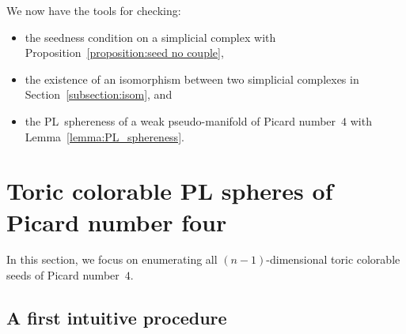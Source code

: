 \documentclass[11pt]{amsart}
\theoremstyle{plain}
\numberwithin{equation}{section}
\theoremstyle{definition}
\newtheorem{remark}[theorem]{Remark}
\newcommand{\R}{\mathbb{R}}
\begin{document}
We now have the tools for checking:
\begin{itemize}
	\item the seedness condition on a simplicial complex with Proposition~\ref{proposition:seed no couple},
	\item the existence of an isomorphism between two simplicial complexes in Section~\ref{subsection:isom}, and
	\item the PL~sphereness of a weak pseudo-manifold of Picard number~$4$ with Lemma~\ref{lemma:PL_sphereness}.
\end{itemize}


\section{Toric colorable PL spheres of Picard number four} \label{section:Pic4}
In this section, we focus on enumerating all $(n-1)$-dimensional toric colorable seeds of Picard number~$4$.

\subsection{A first intuitive procedure}

%
%
%
\end{document}
